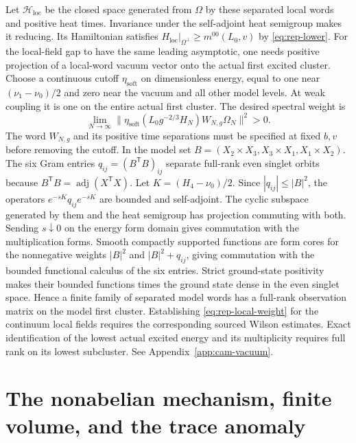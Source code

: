 \documentclass[11pt,a4paper]{article}
\numberwithin{equation}{section}
\begin{document}
Let \(\mathcal H_{\mathrm{loc}}\) be the closed space generated from \(\Omega\) by these separated local words and positive heat times. Invariance under the self-adjoint heat semigroup makes it reducing. Its Hamiltonian satisfies \(H_{\mathrm{loc}}|_{\Omega^\perp}\ge m^{00}(L_0,v)\) by \eqref{eq:rep-lower}. For the local-field gap to have the same leading asymptotic, one needs positive projection of a local-word vacuum vector onto the actual first excited cluster. Choose a continuous cutoff \(\eta_{\mathrm{soft}}\) on dimensionless energy, equal to one near \((\nu_1-\nu_0)/2\) and zero near the vacuum and all other model levels. At weak coupling it is one on the entire actual first cluster. The desired spectral weight is
\begin{equation}\label{eq:rep-local-weight}
     \lim_{N\to\infty}
       \big\|\eta_{\mathrm{soft}}(L_0g^{-2/3}H_N)
                    W_{N,g}\Omega_N\big\|^2>0 .
\end{equation}
The word \(W_{N,g}\) and its positive time separations must be specified at fixed \(b,v\) before removing the cutoff. In the model set \(B=(X_2\times X_3,X_3\times X_1,X_1\times X_2)\). The six Gram entries \(q_{ij}=(B^{\mathsf T}B)_{ij}\) separate full-rank even singlet orbits because \(B^{\mathsf T}B=\operatorname{adj}(X^{\mathsf T}X)\). Let \(K=(H_4-\nu_0)/2\). Since \(|q_{ij}|\le |B|^2\), the operators \(e^{-sK}q_{ij}e^{-sK}\) are bounded and self-adjoint. The cyclic subspace generated by them and the heat semigroup has projection commuting with both. Sending \(s\downarrow0\) on the energy form domain gives commutation with the multiplication forms. Smooth compactly supported functions are form cores for the nonnegative weights \(|B|^2\) and \(|B|^2+q_{ij}\), giving commutation with the bounded functional calculus of the six entries. Strict ground-state positivity makes their bounded functions times the ground state dense in the even singlet space. Hence a finite family of separated model words has a full-rank observation matrix on the model first cluster. Establishing \eqref{eq:rep-local-weight} for the continuum local fields requires the corresponding sourced Wilson estimates. Exact identification of the lowest actual excited energy and its multiplicity requires full rank on its lowest subcluster. See Appendix~\ref{app:cam-vacuum}.

\section{The nonabelian mechanism, finite volume, and the trace anomaly}
\label{sec:discussion}
\end{document}
